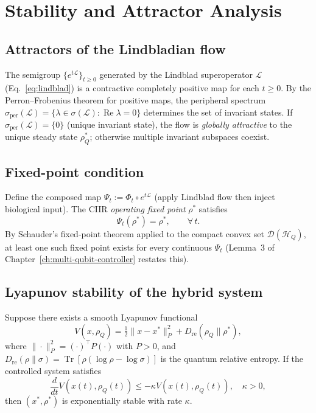 \section{Stability and Attractor Analysis}
\label{sec:ch21-stability}

\subsection{Attractors of the Lindbladian flow}

The semigroup $\{e^{t\mathcal{L}}\}_{t \geq 0}$ generated by the
Lindblad superoperator $\mathcal{L}$ (Eq.~\eqref{eq:lindblad}) is a
contractive completely positive map for each $t \geq 0$.  By the
Perron--Frobenius theorem for positive maps, the peripheral spectrum
$\sigma_{\mathrm{per}}(\mathcal{L}) = \{\lambda \in \sigma(\mathcal{L}) :
\operatorname{Re}\lambda = 0\}$ determines the set of invariant states.
If $\sigma_{\mathrm{per}}(\mathcal{L}) = \{0\}$ (unique invariant state),
the flow is \emph{globally attractive} to the unique steady state
$\rho_Q^*$; otherwise multiple invariant subspaces coexist.

\subsection{Fixed-point condition}

Define the composed map $\Psi_t := \Phi_t \circ e^{t\mathcal{L}}$
(apply Lindblad flow then inject biological input).  The CIIR
\emph{operating fixed point} $\rho^*$ satisfies
\begin{equation}\label{eq:fixed-point}
  \Psi_t(\rho^*) = \rho^*, \qquad \forall\, t.
\end{equation}
By Schauder's fixed-point theorem applied to the compact convex set
$\mathcal{D}(\mathcal{H}_Q)$, at least one such fixed point exists for
every continuous $\Psi_t$ (Lemma~3 of Chapter~\ref{ch:multi-qubit-controller}
restates this).

\subsection{Lyapunov stability of the hybrid system}

\begin{proposition}\label{prop:lyapunov}
Suppose there exists a smooth Lyapunov functional
\begin{equation}\label{eq:lyapunov}
  V(x, \rho_Q)
  = \tfrac{1}{2}\|x - x^*\|_P^2
  + D_{\mathrm{re}}(\rho_Q\|\rho^*),
\end{equation}
where $\|\cdot\|_P^2 = (\cdot)^\top P(\cdot)$ with $P > 0$, and
$D_{\mathrm{re}}(\rho\|\sigma) = \operatorname{Tr}[\rho(\log\rho - \log\sigma)]$
is the quantum relative entropy.  If the controlled system satisfies
\begin{equation}\label{eq:lyapunov-decay}
  \frac{d}{dt} V(x(t), \rho_Q(t))
  \leq -\kappa V(x(t), \rho_Q(t)),
  \quad \kappa > 0,
\end{equation}
then $(x^*, \rho^*)$ is exponentially stable with rate $\kappa$.
\end{proposition}

